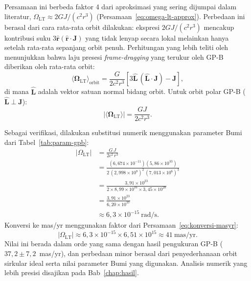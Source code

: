 Persamaan ini berbeda faktor 4 dari aproksimasi yang sering dijumpai
dalam literatur, $\Omega_{\text{LT}} \approx 2GJ/(c^2 r^3)$
(Persamaan~\ref{eq:omega-lt-approx}).
Perbedaan ini berasal dari cara rata-rata orbit dilakukan:
ekspresi $2GJ/(c^2 r^3)$ mencakup kontribusi suku
$3\hat{\mathbf{r}}(\hat{\mathbf{r}} \cdot \mathbf{J})$
yang tidak lenyap secara lokal melainkan hanya setelah rata-rata sepanjang orbit penuh.
Perhitungan yang lebih teliti oleh \textcite{Adler2014}
menunjukkan bahwa laju presesi \textit{frame-dragging}
yang terukur oleh GP-B diberikan oleh rata-rata orbit:
\begin{equation}
    \boxed{
    \langle\bm{\Omega}_{\text{LT}}\rangle_{\text{orbit}}
    = \frac{G}{2c^2 r^3}
    \left[3\hat{\mathbf{L}}\,(\hat{\mathbf{L}} \cdot \mathbf{J}) - \mathbf{J}\right],
    }
    \label{eq:omega-lt-orbit-avg}
\end{equation}
di mana $\hat{\mathbf{L}}$ adalah vektor satuan normal bidang orbit.
Untuk orbit polar GP-B ($\hat{\mathbf{L}} \perp \mathbf{J}$):
\begin{equation}
    |\langle\bm{\Omega}_{\text{LT}}\rangle| = \frac{GJ}{2c^2 r^3}.
    \label{eq:omega-lt-gpb-value}
\end{equation}

Sebagai verifikasi, dilakukan substitusi numerik
menggunakan parameter Bumi dari Tabel~\ref{tab:param-gpb}:
\begin{equation}
\begin{aligned}
    |\Omega_{\text{LT}}|
    &= \frac{G\,J}{2c^2\,r^3} \\[4pt]
    &= \frac{(6{,}674 \times 10^{-11})(5{,}86 \times 10^{33})}
           {2\,(2{,}998 \times 10^8)^2\,(7{,}013 \times 10^6)^3} \\[4pt]
    &= \frac{3{,}91 \times 10^{23}}{2 \times 8{,}99 \times 10^{16} \times 3{,}45 \times 10^{20}} \\[4pt]
    &= \frac{3{,}91 \times 10^{23}}{6{,}20 \times 10^{37}} \\[4pt]
    &\approx 6{,}3 \times 10^{-15}~\text{rad/s}.
\end{aligned}
    \label{eq:omega-lt-numeric}
\end{equation}
Konversi ke mas/yr menggunakan faktor dari Persamaan~\eqref{eq:konversi-masyr}:
\begin{equation}
    |\Omega_{\text{LT}}| \approx 6{,}3 \times 10^{-15} \times 6{,}51 \times 10^{15}
    \approx 41~\text{mas/yr}.
    \label{eq:omega-lt-masyr}
\end{equation}
Nilai ini berada dalam orde yang sama dengan hasil pengukuran GP-B
($37{,}2 \pm 7{,}2$~mas/yr), dan perbedaan minor berasal dari
penyederhanaan orbit sirkular ideal serta nilai parameter Bumi
yang digunakan.
Analisis numerik yang lebih presisi disajikan pada Bab~\ref{chap:hasil}.


